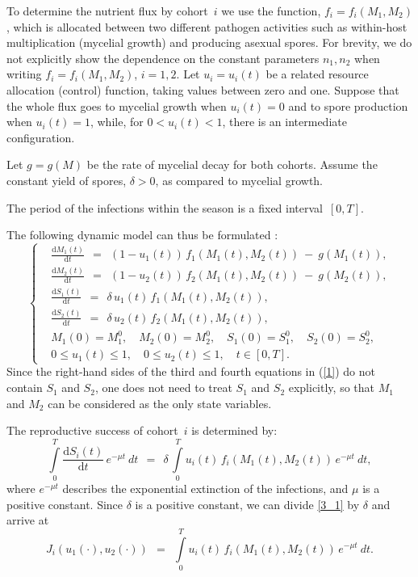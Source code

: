 \documentclass[11pt]{amsart}
\begin{document}
To determine the nutrient flux by cohort~$ i $ we use the function,
$ f_i = f_i(M_1, M_2) $, which is allocated between two different pathogen
activities such as within-host multiplication (mycelial growth) and producing
asexual spores. For brevity, we do not explicitly show the dependence on the
constant parameters $ n_1, n_2 $ when writing $ f_i = f_i(M_1, M_2) $,
$ i = 1,2 $. Let $ u_i = u_i(t) $ be a related resource allocation (control)
function, taking values between zero and one. Suppose that the whole flux goes
to mycelial growth when $ u_i(t) = 0 $ and to spore production when
$ u_i(t) = 1 $, while, for $ 0 < u_i(t) < 1 $, there is an intermediate
configuration.

Let $ g = g(M) $ be the rate of mycelial decay for both cohorts. Assume the
constant yield of spores, $ \delta > 0 $, as compared to mycelial growth.

The period of the infections within the season is a fixed interval~$ [0, T] $.

The following dynamic model can thus be formulated 
\cite{YegorovGrognardMailleretHalkettBernhard2019}:
\begin{equation}
\left\{ \begin{aligned}
& \frac{\mathrm{d} M_1(t)}{\mathrm{d} t} \:\: = \:\: (1 - u_1(t)) \,
  f_1(M_1(t), M_2(t)) \: - \: g(M_1(t)), \\
& \frac{\mathrm{d} M_2(t)}{\mathrm{d} t} \:\: = \:\: (1 - u_2(t)) \,
  f_2(M_1(t), M_2(t)) \: - \: g(M_2(t)), \\
& \frac{\mathrm{d} S_1(t)}{\mathrm{d} t} \:\: = \:\: \delta \, u_1(t) \,
  f_1(M_1(t), M_2(t)), \\
& \frac{\mathrm{d} S_2(t)}{\mathrm{d} t} \:\: = \:\: \delta \, u_2(t) \,
  f_2(M_1(t), M_2(t)), \\
& M_1(0) = M_1^0, \quad M_2(0) = M_2^0, \quad S_1(0) = S_1^0,
  \quad S_2(0) = S_2^0, \\
& 0 \leqslant u_1(t) \leqslant 1, \quad 0 \leqslant u_2(t) \leqslant 1,
  \quad t \in [0, T].
\end{aligned} \right.  \label{1}
\end{equation}
Since the right-hand sides of the third and fourth equations in (\ref{1}) do
not contain $ S_1 $ and $ S_2 $, one does not need to treat $ S_1 $ and $ S_2 $
explicitly, so that $ M_1 $ and $ M_2 $ can be considered as the only state
variables.

The reproductive success of cohort~$ i $ is determined by:
\begin{equation}
\int\limits_0^T \frac{\mathrm{d} S_i(t)}{\mathrm{d} t} \, e^{-\mu t}
    \: dt \:\: = \:\: \delta \,
\int\limits_0^T u_i(t) \, f_i(M_1(t), M_2(t)) \, e^{-\mu t} \: dt,  \label{3_1}
\end{equation}
where $ e^{-\mu t} $ describes the exponential extinction of the infections,
and $ \mu $ is a positive constant. Since $ \delta $ is a positive constant,
we can divide \cref{3_1} by $ \delta $ and arrive at
\begin{equation}
J_i(u_1(\cdot), u_2(\cdot)) \:\: = \:\: \int\limits_0^T u_i(t) \, f_i(M_1(t),
  M_2(t)) \, e^{-\mu t} \: dt.  \label{3}
\end{equation}
\end{document}
